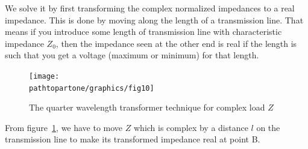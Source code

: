 We solve it by first transforming the complex normalized impedances to a real impedance. This is done by moving along the length of a transmission line. That means if you introduce some length of transmission line with characteristic impedance $ Z_0$, then the impedance seen at the other end is real if the length is such that you get a voltage (maximum or minimum) for that length.
\begin{figure}[h]
\centering
\texttt{[image: \\pathtopartone/graphics/fig10]}
\caption{The quarter wavelength transformer technique for complex load $Z$}
\label{fig:fig10}
\end{figure}

From figure~\ref{fig:fig10}, we have to move $Z$ which is complex by a distance $l$ on the transmission line to make its transformed impedance real at point B.

